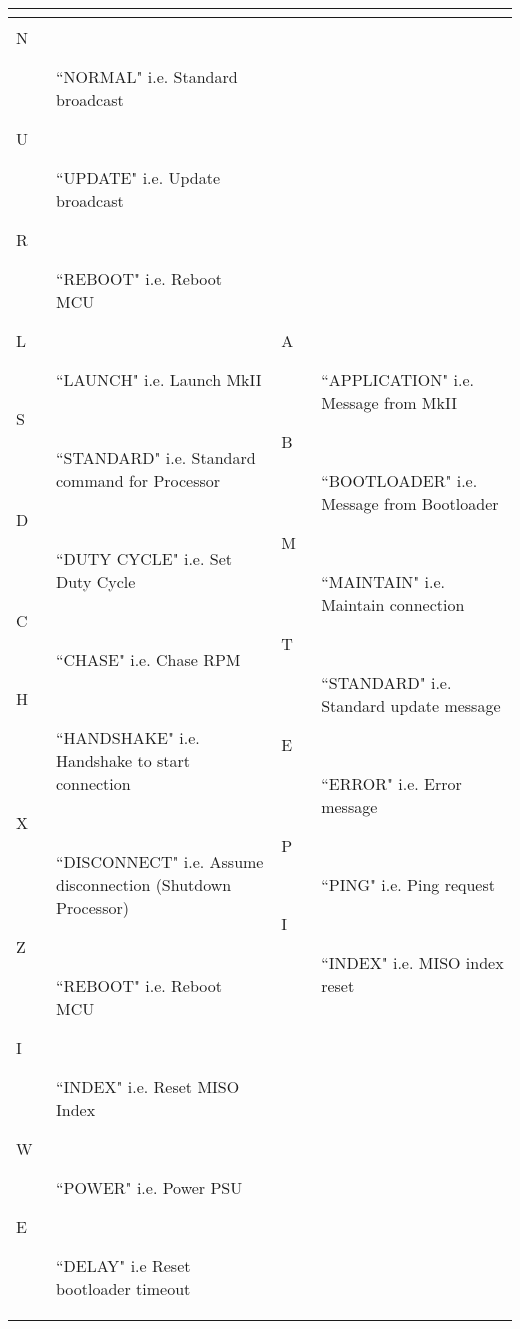 \documentclass{article}
\begin{document}
\begin{center}
\begin{longtable}{| p{} | p{} |}
\begin{itemize}
	\end{itemize}
	\\
	\hline
	\pagebreak
	\hline
	\multicolumn{2}{|c|}{\textbf{Legend}}\\*
	\hline
	\begin{description}
		\item[N] ``NORMAL" i.e. Standard broadcast
		\item[U] ``UPDATE" i.e. Update broadcast
		\item[R] ``REBOOT" i.e. Reboot MCU
		\item[L] ``LAUNCH" i.e. Launch MkII
		\item[S] ``STANDARD" i.e. Standard command for Processor
		\item[D] ``DUTY CYCLE" i.e. Set Duty Cycle
		\item[C] ``CHASE" i.e. Chase RPM
		\item[H] ``HANDSHAKE" i.e. Handshake to start connection
		\item[X] ``DISCONNECT" i.e. Assume disconnection (Shutdown Processor)
		\item[Z] ``REBOOT" i.e. Reboot MCU
		\item[I] ``INDEX" i.e. Reset MISO Index
		\item[W] ``POWER" i.e. Power PSU
		\item[E] ``DELAY" i.e Reset bootloader timeout
	\end{description}
	&
	\begin{description}
		\item[A] ``APPLICATION" i.e. Message from MkII
		\item[B] ``BOOTLOADER" i.e. Message from Bootloader
		\item[M] ``MAINTAIN" i.e. Maintain connection
		\item[T] ``STANDARD" i.e. Standard update message
		\item[E] ``ERROR" i.e. Error message
		\item[P] ``PING" i.e. Ping request
		\item[I] ``INDEX" i.e. MISO index reset
	\end{description}
	\\
	\hline

\end{longtable}
\end{center}
\end{document}
